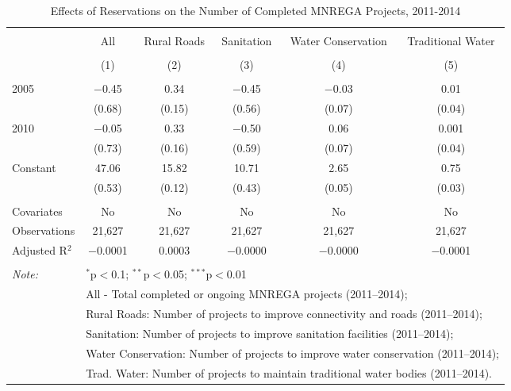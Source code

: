 
\begin{table}[!htbp] \centering 
  \caption{Effects of Reservations on the Number of Completed MNREGA Projects, 2011-2014} 
  \label{} 
\begin{tabular}{@{\extracolsep{5pt}}lccccc} 
\\[-1.8ex]\hline 
\hline \\[-1.8ex] 
 & All & Rural Roads & Sanitation & Water Conservation & Traditional Water \\ 
\\[-1.8ex] & (1) & (2) & (3) & (4) & (5)\\ 
\hline \\[-1.8ex] 
 2005 & $-$0.45 & 0.34 & $-$0.45 & $-$0.03 & 0.01 \\ 
  & (0.68) & (0.15) & (0.56) & (0.07) & (0.04) \\ 
  2010 & $-$0.05 & 0.33 & $-$0.50 & 0.06 & 0.001 \\ 
  & (0.73) & (0.16) & (0.59) & (0.07) & (0.04) \\ 
  Constant & 47.06 & 15.82 & 10.71 & 2.65 & 0.75 \\ 
  & (0.53) & (0.12) & (0.43) & (0.05) & (0.03) \\ 
 \hline \\[-1.8ex] 
Covariates & No & No & No & No & No \\ 
Observations & 21,627 & 21,627 & 21,627 & 21,627 & 21,627 \\ 
Adjusted R$^{2}$ & $-$0.0001 & 0.0003 & $-$0.0000 & $-$0.0000 & $-$0.0001 \\ 
\hline 
\hline \\[-1.8ex] 
\textit{Note:}  & \multicolumn{5}{l}{$^{*}$p$<$0.1; $^{**}$p$<$0.05; $^{***}$p$<$0.01} \\ 
 & \multicolumn{5}{l}{All - Total completed or ongoing MNREGA projects (2011--2014);} \\ 
 & \multicolumn{5}{l}{Rural Roads: Number of projects to improve connectivity and roads (2011--2014);} \\ 
 & \multicolumn{5}{l}{Sanitation:  Number of projects to improve sanitation facilities  (2011--2014);} \\ 
 & \multicolumn{5}{l}{Water Conservation: Number of projects to improve water conservation (2011--2014);} \\ 
 & \multicolumn{5}{l}{Trad. Water: Number of projects to maintain traditional water bodies (2011--2014).} \\ 
\end{tabular} 
\end{table} 
